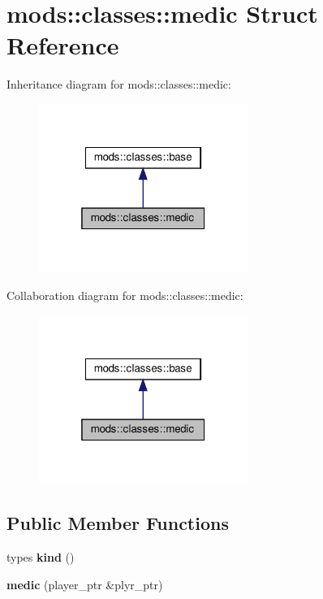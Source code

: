 \hypertarget{structmods_1_1classes_1_1medic}{}\section{mods\+:\+:classes\+:\+:medic Struct Reference}
\label{structmods_1_1classes_1_1medic}


Inheritance diagram for mods\+:\+:classes\+:\+:medic\+:\nopagebreak
\begin{figure}[H]
\begin{center}
\leavevmode
\includegraphics[width=193pt]{structmods_1_1classes_1_1medic__inherit__graph}
\end{center}
\end{figure}


Collaboration diagram for mods\+:\+:classes\+:\+:medic\+:\nopagebreak
\begin{figure}[H]
\begin{center}
\leavevmode
\includegraphics[width=193pt]{structmods_1_1classes_1_1medic__coll__graph}
\end{center}
\end{figure}
\subsection*{Public Member Functions}
\begin{DoxyCompactItemize}
\item 
\mbox{\label{structmods_1_1classes_1_1medic_af9d320c276d3bee3a07bff14340e8810}} 
types {\bfseries kind} ()
\item 
\mbox{\label{structmods_1_1classes_1_1medic_a18aa862e17d8d35ae73ebefd171e0117}} 
{\bfseries medic} (player\+\_\+ptr \&plyr\+\_\+ptr)
\end{DoxyCompactItemize}
